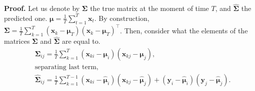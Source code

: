 \documentclass[12pt]{article}
\begin{document}
\textbf{Proof.} Let us denote by $\mathbf{\Sigma}$ the true matrix at the moment of time $T$, and $\hat{\mathbf{\Sigma}}$ the predicted one. $\boldsymbol{\mu} = \frac{1}{T} \sum_{t=1}^{T} \mathbf{x}_t$. By construction, ${\mathbf{\Sigma}} = \frac{1}{T} \sum_{k=1}^{T} (\mathbf{x}_k - \boldsymbol{\mu}_T)(\mathbf{x}_k - \boldsymbol{\mu}_T)^\intercal$. Then, consider what the elements of the matrices $\mathbf{\Sigma}$ and $\hat{\mathbf{\Sigma}}$ are equal to.
\begin{align*}
	&\mathbf{\Sigma}_{ij} = \frac{1}{T}\sum_{k=1}^{T}(\mathbf{x}_{ki} - \boldsymbol{\mu}_i)(\mathbf{x}_{kj}-\boldsymbol{\mu}_j),\\
    &\text{separating last term,}\\
	&\hat{\mathbf{\Sigma}}_{ij} = \frac{1}{T}\sum_{k=1}^{T-1}(\mathbf{x}_{ki} - \hat{\boldsymbol{\mu}}_i)(\mathbf{x}_{kj}-\hat{\boldsymbol{\mu}}_j) + (\mathbf{y}_i - \hat{\boldsymbol{\mu}}_i)(\mathbf{y}_j - \hat{\boldsymbol{\mu}}_j).
\end{align*}
\end{document}
